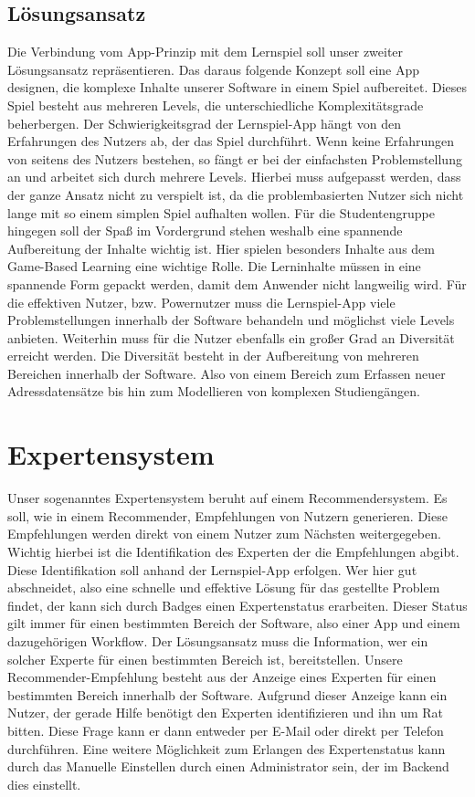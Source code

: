 \subsection{Lösungsansatz}
Die Verbindung vom App-Prinzip mit dem Lernspiel soll unser zweiter Lösungsansatz repräsentieren. Das daraus folgende Konzept soll eine App designen, die komplexe Inhalte unserer Software in einem Spiel aufbereitet. Dieses Spiel besteht aus mehreren Levels, die unterschiedliche Komplexitätsgrade beherbergen. Der Schwierigkeitsgrad der Lernspiel-App hängt von den Erfahrungen des Nutzers ab, der das Spiel durchführt. Wenn keine Erfahrungen von seitens des Nutzers bestehen, so fängt er bei der einfachsten Problemstellung an und arbeitet sich durch mehrere Levels. Hierbei muss aufgepasst werden, dass der ganze Ansatz nicht zu verspielt ist, da die problembasierten Nutzer sich nicht lange mit so einem simplen Spiel aufhalten wollen. Für die Studentengruppe hingegen soll der Spaß im Vordergrund stehen weshalb eine spannende Aufbereitung der Inhalte wichtig ist. Hier spielen besonders Inhalte aus dem Game-Based Learning eine wichtige Rolle. Die Lerninhalte müssen in eine spannende Form gepackt werden, damit dem Anwender nicht langweilig wird.  Für die effektiven Nutzer, bzw. Powernutzer muss die Lernspiel-App viele Problemstellungen innerhalb der Software behandeln und möglichst viele Levels anbieten. Weiterhin muss für die Nutzer ebenfalls ein großer Grad an Diversität erreicht werden. Die Diversität besteht in der Aufbereitung von mehreren Bereichen innerhalb der Software. Also von einem Bereich zum Erfassen neuer Adressdatensätze bis hin zum Modellieren von komplexen Studiengängen.


\section{Expertensystem}
Unser sogenanntes Expertensystem beruht auf einem Recommendersystem. Es soll, wie in einem Recommender, Empfehlungen von Nutzern generieren. Diese Empfehlungen werden direkt von einem Nutzer zum Nächsten weitergegeben. Wichtig hierbei ist die Identifikation des Experten der die Empfehlungen abgibt. Diese Identifikation soll anhand der Lernspiel-App erfolgen. Wer hier gut abschneidet, also eine schnelle und effektive Lösung für das gestellte Problem findet, der kann sich durch Badges einen Expertenstatus erarbeiten. Dieser Status gilt immer für einen bestimmten Bereich der Software, also einer App und einem dazugehörigen Workflow. Der Lösungsansatz muss die Information, wer ein solcher Experte für einen bestimmten Bereich ist, bereitstellen. Unsere Recommender-Empfehlung besteht aus der Anzeige eines Experten für einen bestimmten Bereich innerhalb der Software. Aufgrund dieser Anzeige kann ein Nutzer, der gerade Hilfe benötigt den Experten identifizieren und ihn um Rat bitten. Diese Frage kann er dann entweder per E-Mail oder direkt per Telefon durchführen. Eine weitere Möglichkeit zum Erlangen des Expertenstatus kann durch das Manuelle Einstellen durch einen Administrator sein, der im Backend dies einstellt.


